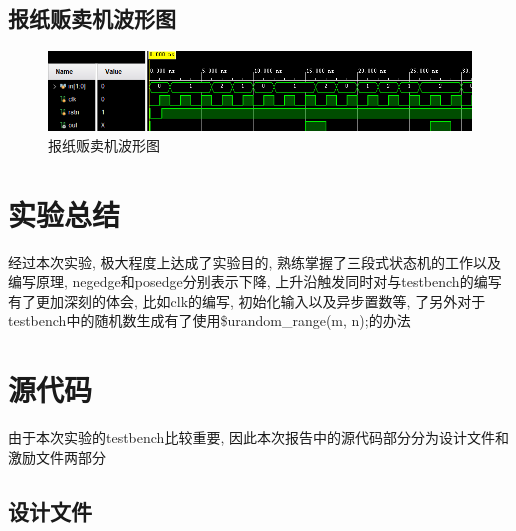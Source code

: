 \documentclass[fontset=windows,12pt]{article}
\begin{document}
        \subsection{报纸贩卖机波形图}
        \begin{figure}[ht]
            \centering
            \includegraphics[width=1\textwidth]{波形图4.jpg}
            \caption{报纸贩卖机波形图}
        \end{figure}




\section{实验总结}
    经过本次实验, 极大程度上达成了实验目的, 熟练掌握了三段式状态机的工作以及编写原理, negedge和posedge分别表示下降, 上升沿触发同时对与testbench的编写有了更加深刻的体会, 比如clk的编写, 初始化输入以及异步置数等, 
    了另外对于testbench中的随机数生成有了使用\$urandom\_range(m, n);的办法



\section{源代码}
    由于本次实验的testbench比较重要, 因此本次报告中的源代码部分分为设计文件和激励文件两部分
    \subsection{设计文件}
\end{document}
